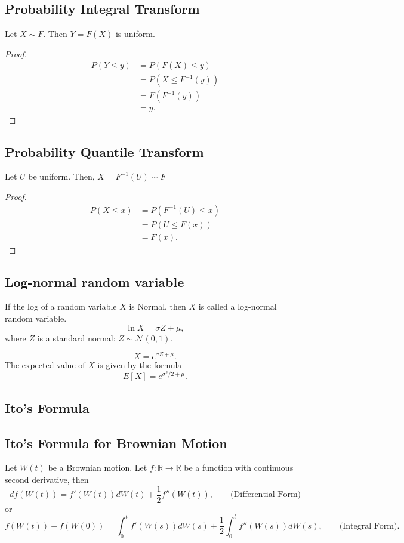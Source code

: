 \documentclass{amsart}
\theoremstyle{plain}
\numberwithin{equation}{section}
\begin{document}
\subsection{Probability Integral Transform}
Let $X \sim F$. Then $Y = F(X)$ is uniform. 
\begin{proof}
\begin{align*}
P(Y \leq y ) &= P(F(X) \leq y )\\
&= P(X \leq F^{-1}(y))\\
&= F(F^{-1}(y))\\
&= y.
\end{align*}

\end{proof}

\subsection{Probability Quantile Transform}
Let $U$ be uniform. Then, $X=F^{-1}(U) \sim F$
\begin{proof}
\begin{align*}
P(X \leq x ) &= P(F^{-1}(U) \leq x )\\
&= P(U \leq F(x))\\
&= F(x).
\end{align*}
\end{proof}


\subsection*{Log-normal random variable}
If the log of a random variable $X$ is 
Normal, then $X$ is called a log-normal
random variable.
\begin{equation}
\ln X = \sigma Z + \mu,
\end{equation}
where $Z$ is a
standard normal: $Z \sim \mathcal{N}(0, 1)$.

\begin{equation}
X = e^{\sigma Z + \mu}.
\end{equation}
The expected value of $X$ is 
given by the formula
\begin{equation}
E[X] = e^{\sigma^2/2 + \mu}.
\end{equation}

\subsection{Ito's Formula}
\subsection{Ito's Formula for Brownian Motion}
Let $W(t)$ be a Brownian motion. Let $f: \mathbb{R} \to \mathbb{R}$ 
be a function with continuous second derivative, 
then 
\begin{equation}
df(W(t)) = f'(W(t)) dW(t) + \frac{1}{2} f''(W(t)),
\qquad \mbox{(Differential Form)}
\end{equation}
or
\begin{equation}
f(W(t)) - f(W(0)) = \int_0^t f'(W(s)) dW(s) + 
\frac{1}{2} \int_0^t f''(W(s)) dW(s),
\qquad \mbox{(Integral Form)}.
\end{equation}
\end{document}
